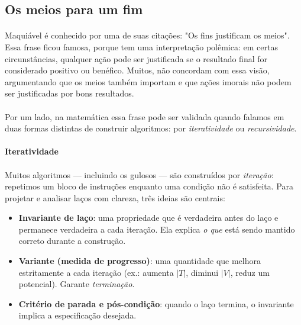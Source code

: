 \documentclass[12pt,a4paper]{article}
\begin{document}
\subsection{Os meios para um fim}

\paragraph{}
Maquiável é conhecido por uma de suas citações: "Os fins justificam os meios". Essa frase ficou famosa, porque tem uma interpretação polêmica: em certas circunstâncias, qualquer ação pode ser justificada se o resultado final for considerado positivo ou benéfico. Muitos, não concordam com essa visão, argumentando que os meios também importam e que ações imorais não podem ser justificadas por bons resultados.

\paragraph{}
Por um lado, na matemática essa frase pode ser validada quando falamos em duas formas distintas de construir algoritmos: por \emph{iteratividade} ou \emph{recursividade}.

\paragraph{Iteratividade}
\paragraph{}
Muitos algoritmos — incluindo os gulosos — são construídos por \emph{iteração}: repetimos um bloco de instruções enquanto uma condição não é satisfeita. Para projetar e analisar laços com clareza, três ideias são centrais:

\begin{itemize}\setlength{\itemsep}{2pt}
    \item \textbf{Invariante de laço}: uma propriedade que é verdadeira antes do laço e permanece verdadeira a cada iteração. Ela explica \emph{o que} está sendo mantido correto durante a construção.
    \item \textbf{Variante (medida de progresso)}: uma quantidade que melhora estritamente a cada iteração (ex.: aumenta $|T|$, diminui $|V|$, reduz um potencial). Garante \emph{terminação}.
    \item \textbf{Critério de parada e pós-condição}: quando o laço termina, o invariante implica a especificação desejada.
\end{itemize}
\end{document}
